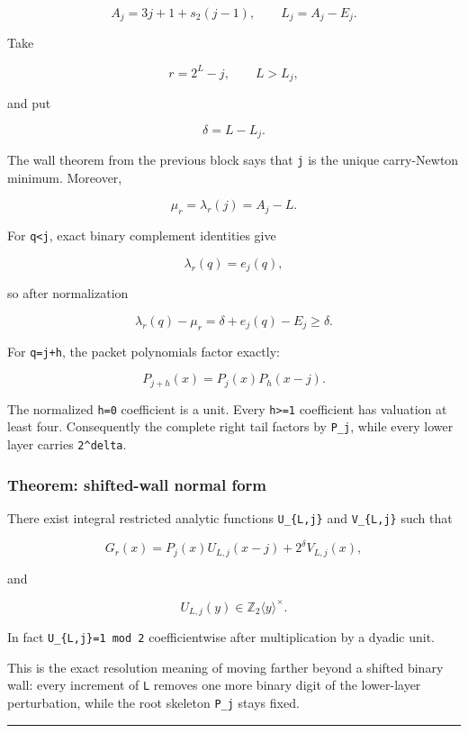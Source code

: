 \documentclass[11pt,letterpaper]{article}
\begin{document}
\[
A_j=3j+1+s_2(j-1),
\qquad
L_j=A_j-E_j.
\]

Take

\[
r=2^L-j,\qquad L>L_j,
\]

and put

\[
\delta=L-L_j.
\]

The wall theorem from the previous block says that \texttt{j} is the unique carry-Newton minimum. Moreover,

\[
\mu_r=\lambda_r(j)=A_j-L.
\]

For \texttt{q\textless{}j}, exact binary complement identities give

\[
\lambda_r(q)=e_j(q),
\]

so after normalization

\[
\lambda_r(q)-\mu_r
=\delta+e_j(q)-E_j
\ge\delta.
\]

For \texttt{q=j+h}, the packet polynomials factor exactly:

\[
\boxed{P_{j+h}(x)=P_j(x)P_h(x-j).}
\]

The normalized \texttt{h=0} coefficient is a unit. Every \texttt{h\textgreater{}=1} coefficient has valuation at least four. Consequently the complete right tail factors by \texttt{P\_j}, while every lower layer carries \texttt{2\^{}delta}.

\subsubsection{Theorem: shifted-wall normal form}\label{theorem-shifted-wall-normal-form}

There exist integral restricted analytic functions \texttt{U\_\{L,j\}} and \texttt{V\_\{L,j\}} such that

\[
\boxed{
G_r(x)
=P_j(x)U_{L,j}(x-j)+2^\delta V_{L,j}(x),
}
\]

and

\[
\boxed{U_{L,j}(y)\in\mathbb Z_2\langle y\rangle^\times.}
\]

In fact \texttt{U\_\{L,j\}=1\ mod\ 2} coefficientwise after multiplication by a dyadic unit.

This is the exact resolution meaning of moving farther beyond a shifted binary wall: every increment of \texttt{L} removes one more binary digit of the lower-layer perturbation, while the root skeleton \texttt{P\_j} stays fixed.

\begin{center}\rule{0.5\linewidth}{0.5pt}\end{center}
\end{document}
